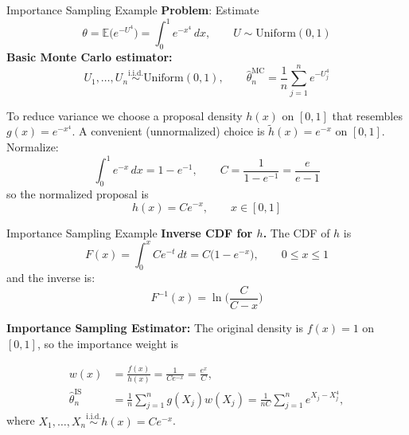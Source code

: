 \documentclass[8pt]{beamer}
\begin{document}
\begin{frame}{Importance Sampling Example}
\textbf{Problem}: Estimate
\begin{equation*}
	\theta=\mathbb{E}\!\bigl(e^{-U^4}\bigr)=\int_0^1 e^{-x^4} \, dx, \qquad U\sim\text{Uniform}(0,1)
\end{equation*}
\textbf{Basic Monte Carlo estimator:}
\begin{equation*}
	U_1,\dots,U_n\overset{\text{i.i.d.}}{\sim}\text{Uniform}(0,1), \qquad \hat{\theta}_n^{\text{MC}}=\frac{1}{n}\sum_{j=1}^n e^{-U_j^4}
\end{equation*}

To reduce variance we choose a proposal density $h(x)$ on $[0,1]$ that resembles $g(x)=e^{-x^4}$.  
A convenient (unnormalized) choice is $\tilde h(x)=e^{-x}$ on $[0,1]$.
Normalize:
\begin{equation*}
	\int_0^1 e^{-x}\,dx = 1-e^{-1},\qquad C=\frac{1}{1-e^{-1}}=\frac{e}{e-1}
\end{equation*}
so the normalized proposal is
\begin{equation*}
	h(x)=C e^{-x},\qquad x\in[0,1]
\end{equation*}
\end{frame}

\begin{frame}{Importance Sampling Example}
\textbf{Inverse CDF for $h$.} The CDF of $h$ is
\begin{equation*}
	F(x)=\int_0^x C e^{-t}\,dt = C\bigl(1-e^{-x}\bigr),\qquad 0\le x\le1
\end{equation*}
and the inverse is:
\begin{equation*}
	F^{-1}(x) = \ln\biggl(\frac{C}{C - x}\biggl)
\end{equation*}

\textbf{Importance Sampling Estimator:} 
The original density is $f(x)=1$ on $[0,1]$, so the importance weight is

\begin{align*}
w(x) &= \frac{f(x)}{h(x)} 
      = \frac{1}{C e^{-x}} 
      = \frac{e^{x}}{C}, \\[1em]
\hat{\theta}_n^{\text{IS}} 
      &= \frac{1}{n}\sum_{j=1}^n g(X_j)w(X_j) 
       = \frac{1}{nC}\sum_{j=1}^n e^{X_j - X_j^4},
\end{align*}
where $X_1, \dots, X_n \overset{\text{i.i.d.}}{\sim} h(x) = C e^{-x}$.
\end{frame}
\end{document}
